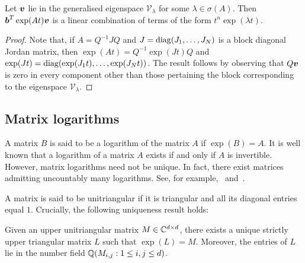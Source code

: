 \begin{proposition}
  Let $\boldsymbol{v}$ lie in the generalised eigenspace
  $\mathcal{V}_{\lambda}$ for some $\lambda \in \sigma(A)$.  Then
  $\boldsymbol{b}^{T}\exp(At)\boldsymbol{v}$ is a linear combination
  of terms of the form $t^{n}\exp(\lambda t)$.
\label{prop:linear}
\end{proposition}

\begin{proof}
  Note that, if $A=Q^{-1}JQ$ and $J=\operatorname{diag}(J_{1},\ldots,J_{N})$ is a block diagonal Jordan matrix, then $\exp(At)=Q^{-1}\exp(Jt)Q$ and $\exp(Jt)=\operatorname{diag}(\exp(J_{1}t),\ldots,\exp(J_{N}t))$.
The result follows by observing that $Q\boldsymbol{v}$ is zero in every component other than those pertaining the block corresponding to the eigenspace $\mathcal{V}_{\lambda}$.
\end{proof}

\subsection{Matrix logarithms}

A matrix $B$ is said to be a logarithm of the matrix $A$ if $\exp(B) = A$. It is well known that a logarithm of a matrix $A$ exists if and only if $A$ is invertible. However, matrix logarithms need not be unique. In fact, there exist matrices admitting uncountably many logarithms. See, for example,~\cite{MatrixLogs1} and~\cite{MatrixLogs2}.

A matrix is said to be unitriangular if it is triangular and all its diagonal entries equal $1$. Crucially, the following uniqueness result holds:

\begin{theorem}
\label{thm:log_uniqueness}
Given an upper unitriangular matrix $M \in \mathbb{C}^{d \times d}$, there exists a unique strictly upper triangular matrix $L$ such that $\exp(L)=M$. Moreover, the entries of $L$ lie in the number field $\mathbb{Q}(M_{i,j}: 1 \leq i,j \leq d)$.
\end{theorem}

